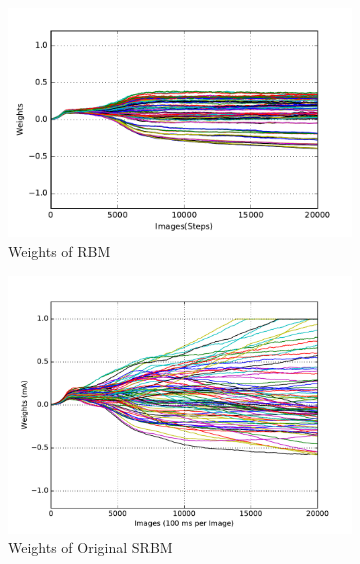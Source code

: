 \begin{figure}
	\centering
	\begin{subfigure}[t]{0.32\textwidth}
		\includegraphics[width=\textwidth]{pics_sdlm/31_exp_RBM_noise/exp3_weights_s.pdf}
		\caption{Weights of RBM}
	\end{subfigure}
	\begin{subfigure}[t]{0.32\textwidth}
		\includegraphics[width=\textwidth]{pics_sdlm/10_exp_SRBM_Orig/exp3_weights_s.pdf}
		\caption{Weights of Original SRBM}
	\end{subfigure}
	\begin{subfigure}[t]{0.32\textwidth}

\end{subfigure}
\end{figure}
